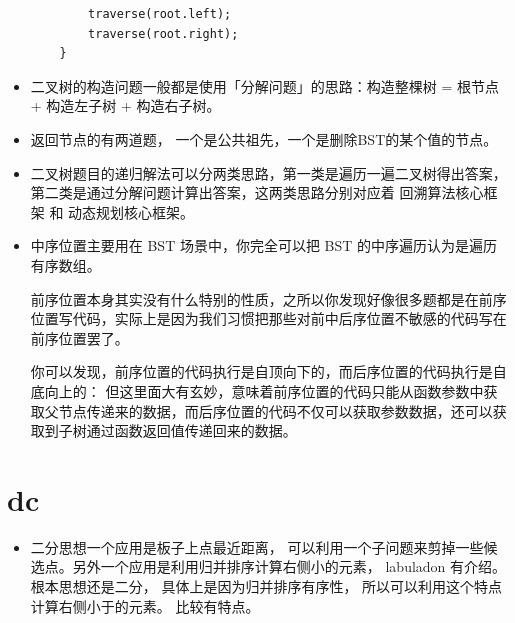 \documentclass[a4paper,11pt,twoside]{book}
\begin{document}
\begin{itemize}
\begin{lstlisting}
		traverse(root.left);
		traverse(root.right);
	}
\end{lstlisting}

\item 二叉树的构造问题一般都是使用「分解问题」的思路：构造整棵树 = 根节点 + 构造左子树 + 构造右子树。

\item 返回节点的有两道题， 一个是公共祖先，一个是删除BST的某个值的节点。

\item 	二叉树题目的递归解法可以分两类思路，第一类是遍历一遍二叉树得出答案，第二类是通过分解问题计算出答案，这两类思路分别对应着 回溯算法核心框架 和 动态规划核心框架。


\item  中序位置主要用在 BST 场景中，你完全可以把 BST 的中序遍历认为是遍历有序数组。

前序位置本身其实没有什么特别的性质，之所以你发现好像很多题都是在前序位置写代码，实际上是因为我们习惯把那些对前中后序位置不敏感的代码写在前序位置罢了。

你可以发现，前序位置的代码执行是自顶向下的，而后序位置的代码执行是自底向上的： 但这里面大有玄妙，意味着前序位置的代码只能从函数参数中获取父节点传递来的数据，而后序位置的代码不仅可以获取参数数据，还可以获取到子树通过函数返回值传递回来的数据。

	
\end{itemize}

\section{dc}
\begin{itemize}
	\item 二分思想一个应用是板子上点最近距离， 可以利用一个子问题来剪掉一些候选点。另外一个应用是利用归并排序计算右侧小的元素， labuladon 有介绍。根本思想还是二分， 具体上是因为归并排序有序性， 所以可以利用这个特点计算右侧小于的元素。 比较有特点。	
\end{itemize}
\end{document}
